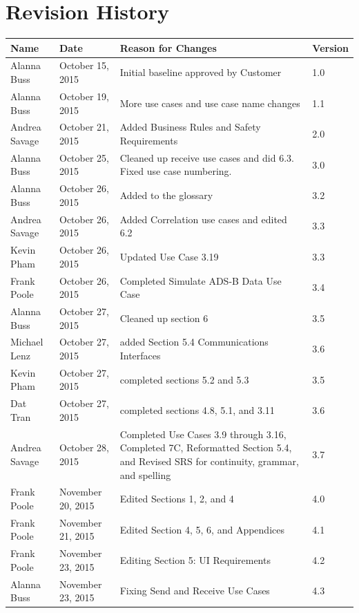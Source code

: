 \documentclass[12pt,oneside,letterpaper]{article}
\begin{document}
\section*{Revision History}
\begin{tabular}{|l|l|p{2.5in}|l|}
\hline
\textbf{Name}&\textbf{Date}&\textbf{Reason for Changes}&\textbf{Version} \\
\hline
Alanna Buss & October 15, 2015 & Initial baseline approved by Customer & 1.0 \\
\hline
Alanna Buss&October 19, 2015&More use cases and use case name changes& 1.1 \\
\hline
Andrea Savage&October 21, 2015&Added Business Rules and Safety Requirements& 2.0 \\
\hline
Alanna Buss&October 25, 2015&Cleaned up receive use cases and did 6.3. Fixed use case numbering.& 3.0 \\
\hline
Alanna Buss&October 26, 2015&Added to the glossary & 3.2 \\
\hline
Andrea Savage &October 26, 2015&Added Correlation use cases and edited 6.2& 3.3 \\
\hline
Kevin Pham&October 26, 2015&Updated Use Case 3.19&3.3 \\
\hline
Frank Poole &October 26, 2015&Completed Simulate ADS-B Data Use Case&3.4 \\
\hline
Alanna Buss&October 27, 2015&Cleaned up section 6 & 3.5 \\
\hline
Michael Lenz&October 27, 2015&added Section 5.4 Communications Interfaces & 3.6 \\
\hline
Kevin Pham &October 27, 2015&completed sections 5.2 and 5.3 & 3.5 \\
\hline
Dat Tran &October 27, 2015&completed sections 4.8, 5.1, and 3.11 & 3.6 \\
\hline
Andrea Savage&October 28, 2015&Completed Use Cases 3.9 through 3.16, Completed 7C, Reformatted Section 5.4, and Revised SRS for continuity, grammar, and spelling& 3.7 \\
\hline
Frank Poole & November 20, 2015 & Edited Sections 1, 2, and 4 & 4.0 \\
\hline
Frank Poole & November 21, 2015 & Edited Section 4, 5, 6, and Appendices & 4.1 \\
\hline
Frank Poole & November 23, 2015 & Editing Section 5: UI Requirements & 4.2 \\
\hline
Alanna Buss&November 23, 2015& Fixing Send and Receive Use Cases&4.3\\
\hline
\end{tabular}
\end{document}
